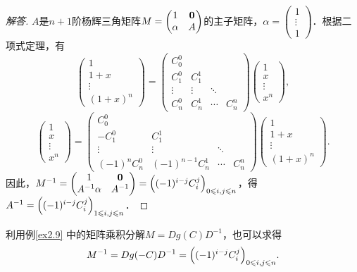 \documentclass[a4paper,fontset=windows]{ctexbook}
\theoremstyle{definition}
\def\note{\noindent\raisebox{10pt}{\dbend}\hspace{7pt}}
\renewcommand{\le}{\leqslant}
\begin{document}
\begin{proof}[解答]
$A$是$n+1$阶杨辉三角矩阵$M=\begin{pmatrix}1&{\bf 0} \\ \alpha&A\end{pmatrix}$的主子矩阵，$\alpha=\left(\begin{smallmatrix}1 \\ \vdots \\[4pt] 1\end{smallmatrix}\right)$．根据二项式定理，有
$$\begin{pmatrix}1 \\ 1+x \\ \vdots \\ (1+x)^n\end{pmatrix}=\begin{pmatrix}C_0^0&&& \\ C_1^0&C_1^1&& \\ \vdots&\vdots&\ddots& \\ C_n^0&C_n^1&\cdots&C_n^n\end{pmatrix}\begin{pmatrix}1 \\ x \\ \vdots \\ x^n\end{pmatrix},$$
$$\begin{pmatrix}1 \\ x \\ \vdots \\ x^n\end{pmatrix}=\begin{pmatrix}C_0^0&&& \\ -C_1^0&C_1^1&& \\ \vdots&\vdots&\ddots& \\ (-1)^nC_n^0&(-1)^{n-1}C_n^1&\cdots&C_n^n\end{pmatrix}\begin{pmatrix}1 \\ 1+x \\ \vdots \\ (1+x)^n\end{pmatrix}.$$
因此，$M^{-1}=\begin{pmatrix}1&{\bf 0} \\ A^{-1}\alpha&A^{-1}\end{pmatrix}=\Bigl((-1)^{i-j}C_i^j\Bigr)_{0\le i,j\le n}$，得$A^{-1}=\Bigl((-1)^{i-j}C_i^j\Bigr)_{1\le i,j\le n}$．
\end{proof}

\note 利用例\ref{ex2.9} 中的矩阵乘积分解$M=Dg(C)D^{-1}$，也可以求得
$$M^{-1}=Dg(-C)D^{-1}=\Bigl((-1)^{i-j}C_i^j\Bigr)_{0\le i,j\le n}.$$
\end{document}

